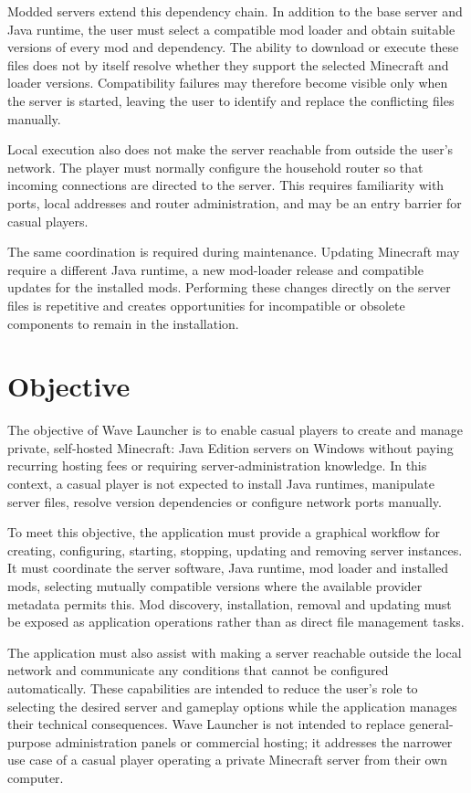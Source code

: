 Modded servers extend this dependency chain. In addition to the base server and Java runtime, the user must select a compatible mod loader and obtain suitable versions of every mod and dependency. The ability to download or execute these files does not by itself resolve whether they support the selected Minecraft and loader versions. Compatibility failures may therefore become visible only when the server is started, leaving the user to identify and replace the conflicting files manually.

Local execution also does not make the server reachable from outside the user's network. The player must normally configure the household router so that incoming connections are directed to the server. This requires familiarity with ports, local addresses and router administration, and may be an entry barrier for casual players.

The same coordination is required during maintenance. Updating Minecraft may require a different Java runtime, a new mod-loader release and compatible updates for the installed mods. Performing these changes directly on the server files is repetitive and creates opportunities for incompatible or obsolete components to remain in the installation.


\section{Objective}

The objective of Wave Launcher is to enable casual players to create and manage private, self-hosted Minecraft: Java Edition servers on Windows without paying recurring hosting fees or requiring server-administration knowledge. In this context, a casual player is not expected to install Java runtimes, manipulate server files, resolve version dependencies or configure network ports manually.

To meet this objective, the application must provide a graphical workflow for creating, configuring, starting, stopping, updating and removing server instances. It must coordinate the server software, Java runtime, mod loader and installed mods, selecting mutually compatible versions where the available provider metadata permits this. Mod discovery, installation, removal and updating must be exposed as application operations rather than as direct file management tasks.

The application must also assist with making a server reachable outside the local network and communicate any conditions that cannot be configured automatically. These capabilities are intended to reduce the user's role to selecting the desired server and gameplay options while the application manages their technical consequences. Wave Launcher is not intended to replace general-purpose administration panels or commercial hosting; it addresses the narrower use case of a casual player operating a private Minecraft server from their own computer.


